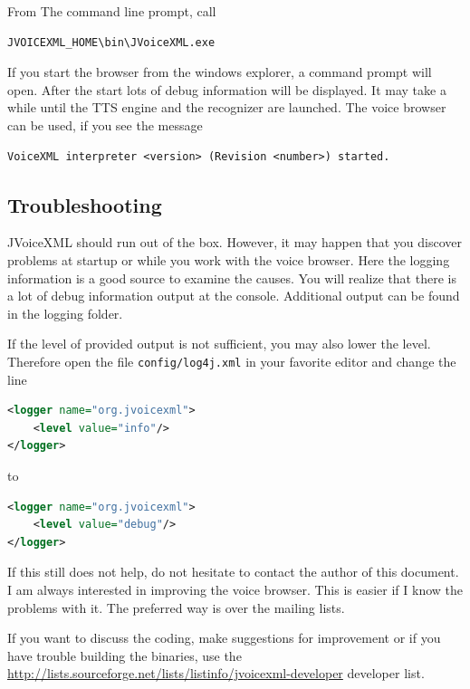 \documentclass[11pt,a4paper]{book}
\begin{document}
From The command line prompt, call

\begin{lstlisting}
JVOICEXML_HOME\bin\JVoiceXML.exe
\end{lstlisting}

If you start the browser from the windows explorer, a command prompt will open.
After the start lots of debug information will be displayed.
It may take a while until the TTS engine and the recognizer are launched.
The voice browser can be used, if you see the message

\begin{lstlisting}
VoiceXML interpreter <version> (Revision <number>) started.
\end{lstlisting}

\subsection{Troubleshooting}

JVoiceXML should run out of the box. However, it may happen that you discover
problems at startup or while you work with the voice browser. Here the logging
information is a good source to examine the causes. You will realize that there
is a lot of debug information output at the console. Additional output can be
found in the logging folder.

If the level of provided output is not sufficient, you may also lower the level.
Therefore open the file \lstinline{config/log4j.xml} in your favorite editor
and change the line

\begin{lstlisting}[language=XML]
<logger name="org.jvoicexml">
    <level value="info"/>
</logger>
\end{lstlisting}

to

\begin{lstlisting}[language=XML]
<logger name="org.jvoicexml">
    <level value="debug"/>
</logger>
\end{lstlisting}

If this still does not help, do not hesitate to contact the author of this
document. I am always interested in improving the voice browser. This is
easier if I know the problems with it. The preferred way is over the mailing
lists.

If you want to discuss the coding, make suggestions for improvement or if
you have trouble building the binaries, use the
\url{http://lists.sourceforge.net/lists/listinfo/jvoicexml-developer}
developer list.
\end{document}
